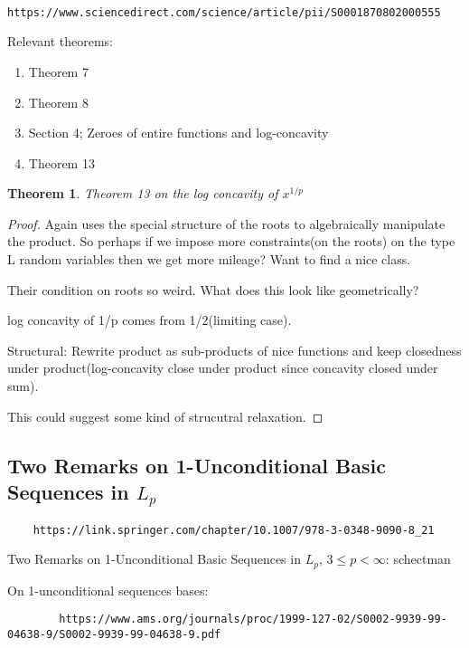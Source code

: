 \documentclass[11pt]{article}
\newtheorem{theorem}{Theorem}
\theoremstyle{remark}
\begin{document}
\begin{verbatim}
	https://www.sciencedirect.com/science/article/pii/S0001870802000555
\end{verbatim}

\begin{remark}
Relevant theorems:
\begin{enumerate}
	\item Theorem 7
	\item Theorem 8
	\item Section 4; Zeroes of entire functions and log-concavity
	\item Theorem 13
\end{enumerate}
\end{remark}

\begin{theorem}
	Theorem 13 on the log concavity of $x^{1/p}$
\end{theorem}

\begin{proof}
	Again uses the special structure of the roots to algebraically manipulate the product. So perhaps if we impose more constraints(on the roots) on the type L random variables then we get more mileage? Want to find a nice class.

	Their condition on roots so weird. What does this look like geometrically?

	log concavity of 1/p comes from 1/2(limiting case). 

	Structural: Rewrite product as sub-products of nice functions and keep closedness under product(log-concavity close under product since concavity closed under sum). 

	This could suggest some kind of strucutral relaxation.
\end{proof}


\subsection{Two Remarks on 1-Unconditional Basic Sequences in $L_p$}

\begin{verbatim}
	https://link.springer.com/chapter/10.1007/978-3-0348-9090-8_21
\end{verbatim}

\begin{remark}
	Two Remarks on 1-Unconditional Basic Sequences in $L_p$, $3 \leq p < \infty$: schectman
\end{remark}

\begin{remark}
	On 1-unconditional sequences bases: 
	\begin{verbatim}
		https://www.ams.org/journals/proc/1999-127-02/S0002-9939-99-04638-9/S0002-9939-99-04638-9.pdf
	\end{verbatim}
\end{remark}
\end{document}
